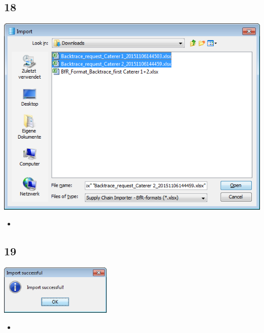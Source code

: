 \documentclass{beamer}
\begin{document}
\subsection{18}
\begin{frame}
	\begin{center}
  		\includegraphics[height=0.5\textheight]{18.png}
	\end{center}
	\begin{itemize}
		\item
	\end{itemize}
\end{frame}

\subsection{19}
\begin{frame}
	\begin{center}
  		\includegraphics[width=0.4\textwidth]{19.png}
	\end{center}
	\begin{itemize}
		\item
	\end{itemize}
\end{frame}
\end{document}
